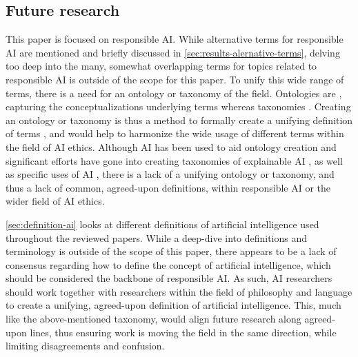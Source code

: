 \subsection{Future research}
This paper is focused on responsible AI. While alternative terms for responsible AI are mentioned and briefly discussed in \autoref{sec:results-alernative-terms}, delving too deep into the many, somewhat overlapping terms for topics related to responsible AI is outside of the scope for this paper. To unify this wide range of terms, there is a need for an ontology or 
taxonomy of the field. Ontologies are , capturing the conceptualizations underlying terms \parencite{Chandrasekaran_1999} whereas taxonomies  \parencite{Kundisch_2022}. Creating an ontology or taxonomy is thus a method to formally create a unifying definition of terms \parencite{Uschold_1996}, and would help to harmonize the wide usage of different terms within the field of AI ethics. Although AI has been used to aid ontology creation \parencite{Stumme_2001} and significant efforts have gone into creating taxonomies of explainable AI \parencite{BarredoArrieta_2020,Clinciu_2019,Graziani_2022,Bellucci_2021,Brennen_2020}, as well as specific uses of AI \parencite{Gunn_2009,Ören_1994,Fong_2003}, there is a lack of a unifying ontology or taxonomy, and thus a lack of common, agreed-upon definitions, within responsible AI or the wider field of AI ethics. %

\autoref{sec:definition-ai} looks at different definitions of artificial intelligence used throughout the reviewed papers. While a deep-dive into definitions and terminology is outside of the scope of this paper, there appears to be a lack of consensus regarding how to define the concept of artificial intelligence, which should be considered the backbone of responsible AI. As such, AI researchers should work together with researchers within the field of philosophy and language to create a unifying, agreed-upon definition of artificial intelligence. This, much like the above-mentioned taxonomy, would align future research along agreed-upon lines, thus ensuring work is moving the field in the same direction, while limiting disagreements and confusion.

